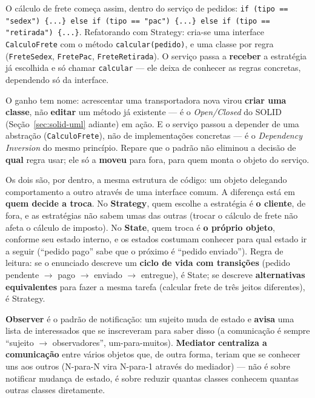 \begin{exemplo}
O cálculo de frete começa assim, dentro do serviço de pedidos:
\texttt{if (tipo == "sedex") \{...\} else if (tipo == "pac") \{...\} else
if (tipo == "retirada") \{...\}}. Refatorando com Strategy: cria-se uma
interface \texttt{CalculoFrete} com o método \texttt{calcular(pedido)}, e
uma classe por regra (\texttt{FreteSedex}, \texttt{FretePac},
\texttt{FreteRetirada}). O serviço passa a \textbf{receber} a estratégia já
escolhida e só chamar \texttt{calcular} --- ele deixa de conhecer as regras
concretas, dependendo só da interface.

O ganho tem nome: acrescentar uma transportadora nova virou \textbf{criar
uma classe}, não \textbf{editar} um método já existente --- é o
\textit{Open/Closed} do SOLID (Seção~\ref{sec:solid-uml} adiante) em ação.
E o serviço passou a depender de uma abstração (\texttt{CalculoFrete}), não
de implementações concretas --- é o \textit{Dependency Inversion} do mesmo
princípio. Repare que o padrão não eliminou a decisão de \textbf{qual}
regra usar; ele só a \textbf{moveu} para fora, para quem monta o objeto do
serviço.
\end{exemplo}

\begin{cuidado}
Os dois são, por dentro, a mesma estrutura de código: um objeto delegando
comportamento a outro através de uma interface comum. A diferença está em
\textbf{quem decide a troca}. No \textbf{Strategy}, quem escolhe a
estratégia é \textbf{o cliente}, de fora, e as estratégias não sabem umas
das outras (trocar o cálculo de frete não afeta o cálculo de imposto). No
\textbf{State}, quem troca é \textbf{o próprio objeto}, conforme seu estado
interno, e os estados costumam conhecer para qual estado ir a seguir
(“pedido pago” sabe que o próximo é “pedido enviado”). Regra de leitura: se
o enunciado descreve um \textbf{ciclo de vida com transições} (pedido
pendente $\to$ pago $\to$ enviado $\to$ entregue), é State; se descreve
\textbf{alternativas equivalentes} para fazer a mesma tarefa (calcular
frete de três jeitos diferentes), é Strategy.
\end{cuidado}

\begin{cuidado}
\textbf{Observer} é o padrão de notificação: um sujeito muda de estado e
\textbf{avisa} uma lista de interessados que se inscreveram para saber
disso (a comunicação é sempre “sujeito $\to$ observadores”, um-para-muitos).
\textbf{Mediator} \textbf{centraliza a comunicação} entre vários objetos
que, de outra forma, teriam que se conhecer uns aos outros (N-para-N vira
N-para-1 através do mediador) --- não é sobre notificar mudança de estado,
é sobre reduzir quantas classes conhecem quantas outras classes
diretamente.
\end{cuidado}

